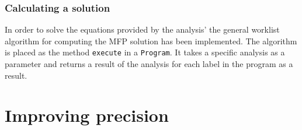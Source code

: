 \subsection{Calculating a solution}
In order to solve the equations provided by the analysis' the general worklist algorithm for computing the MFP solution has been implemented. The algorithm is placed as the method \texttt{execute} in a \texttt{Program}. It takes a specific analysis as a parameter and returns a result of the analysis for each label in the program as a result.

% 


\chapter{Improving precision}

